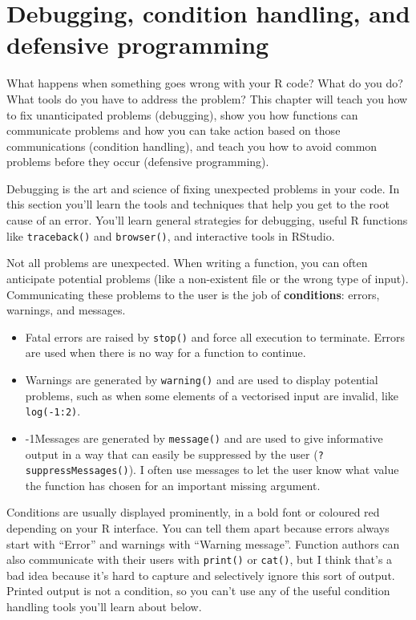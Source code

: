\chapter{Debugging, condition handling, and defensive
programming}\label{debugging}

What happens when something goes wrong with your R code? What do you do?
What tools do you have to address the problem? This chapter will teach
you how to fix unanticipated problems (debugging), show you how
functions can communicate problems and how you can take action based on
those communications (condition handling), and teach you how to avoid
common problems before they occur (defensive programming).

Debugging is the art and science of fixing unexpected problems in your
code. In this section you'll learn the tools and techniques that help
you get to the root cause of an error. You'll learn general strategies
for debugging, useful R functions like \texttt{traceback()} and
\texttt{browser()}, and interactive tools in RStudio.

Not all problems are unexpected. When writing a function, you can often
anticipate potential problems (like a non-existent file or the wrong
type of input). Communicating these problems to the user is the job of
\textbf{conditions}: errors, warnings, and messages.

\begin{itemize}
\item
  Fatal errors are raised by \texttt{stop()} and force all execution to
  terminate. Errors are used when there is no way for a function to
  continue.  
\item
  Warnings are generated by \texttt{warning()} and are used to display
  potential problems, such as when some elements of a vectorised input
  are invalid, like \texttt{log(-1:2)}.
\item
  \looseness-1Messages are generated by \texttt{message()} and are used to give
  informative output in a way that can easily be suppressed by the user
  (\texttt{?suppressMessages()}). I often use messages to let the user
  know what value the function has chosen for an important missing
  argument.
\end{itemize}

Conditions are usually displayed prominently, in a bold font or coloured
red depending on your R interface. You can tell them apart because
errors always start with ``Error'' and warnings with ``Warning
message''. Function authors can also communicate with their users with
\texttt{print()} or \texttt{cat()}, but I think that's a bad idea
because it's hard to capture and selectively ignore this sort of output.
Printed output is not a condition, so you can't use any of the useful
condition handling tools you'll learn about below.

